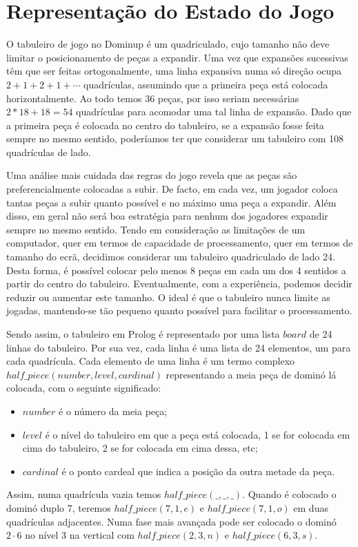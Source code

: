 \documentclass[a4paper]{article}
\begin{document}
\section{Representação do Estado do Jogo}

O tabuleiro de jogo no Dominup é um quadriculado, cujo tamanho não deve limitar o posicionamento de peças a expandir. Uma vez que expansões sucessivas têm que ser feitas ortogonalmente, uma linha expansiva numa só direção ocupa $2 + 1 + 2 + 1 + \cdots$ quadrículas, assumindo que a primeira peça está colocada horizontalmente. Ao todo temos 36 peças, por isso seriam necessárias $2 * 18 + 18 = 54$ quadrículas para acomodar uma tal linha de expansão. Dado que a primeira peça é colocada no centro do tabuleiro, se a expansão fosse feita sempre no mesmo sentido, poderíamos ter que considerar um tabuleiro com 108 quadrículas de lado.

Uma análise mais cuidada das regras do jogo revela que as peças são preferencialmente colocadas a subir. De facto, em cada vez, um jogador coloca tantas peças a subir quanto possível e no máximo uma peça a expandir. Além disso, em geral não será boa estratégia para nenhum dos jogadores expandir sempre no mesmo sentido. Tendo em consideração as limitações de um computador, quer em termos de capacidade de processamento, quer em termos de tamanho do ecrã, decidimos considerar um tabuleiro quadriculado de lado 24. Desta forma, é possível colocar pelo menos 8 peças em cada um dos 4 sentidos a partir do centro do tabuleiro. Eventualmente, com a experiência, podemos decidir reduzir ou aumentar este tamanho. O ideal é que o tabuleiro nunca limite as jogadas, mantendo-se tão pequeno quanto possível para facilitar o processamento.

Sendo assim, o tabuleiro em Prolog é representado por uma lista $board$ de 24 linhas do tabuleiro. Por sua vez, cada linha é uma lista de 24 elementos, um para cada quadrícula. Cada elemento de uma linha é um termo complexo $half\_piece(number, level, cardinal)$ representando a meia peça de dominó lá colocada, com o seguinte significado:
\begin{itemize}
	\item $number$ é o número da meia peça;
	\item $level$ é o nível do tabuleiro em que a peça está colocada, 1 se for colocada em cima do tabuleiro, 2 se for colocada em cima dessa, etc;
	\item $cardinal$ é o ponto cardeal que indica a posição da outra metade da peça.
\end{itemize}
Assim, numa quadrícula vazia temos $half\_piece(\_, \_, \_)$. Quando é colocado o dominó duplo 7, teremos $half\_piece(7,1,e)$ e $half\_piece(7,1,o)$ em duas quadrículas adjacentes. Numa fase mais avançada pode ser colocado o dominó $2 \cdot 6$ no nível 3 na vertical com $half\_piece(2,3,n)$ e $half\_piece(6,3,s)$.
\end{document}
